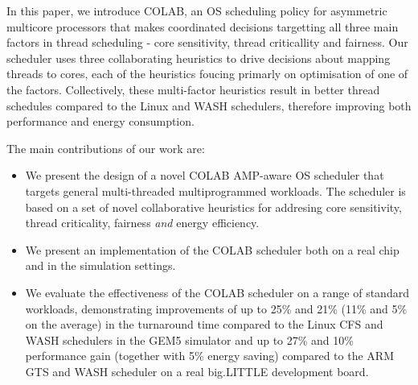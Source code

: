 In this paper, we introduce COLAB, an OS scheduling policy for asymmetric multicore processors that makes coordinated decisions targetting all three main factors in thread scheduling - core sensitivity, thread criticallity and fairness. Our scheduler uses three collaborating heuristics to drive decisions about mapping threads to cores, each of the heuristics foucing primarly on optimisation of one of the factors. Collectively, these multi-factor heuristics result in better thread schedules compared to the Linux and WASH schedulers, therefore improving both performance and energy consumption. %

The main contributions of our work are:
\begin{itemize}
\item  We present the design of a novel COLAB AMP-aware OS scheduler that targets general multi-threaded multiprogrammed workloads. The scheduler is based on a set of novel collaborative heuristics for addresing core sensitivity, thread criticality, fairness \emph{and} energy efficiency.
\item We present an implementation of the COLAB scheduler both on a real chip and in the simulation settings.
\item We evaluate the effectiveness of the COLAB scheduler on a range of standard workloads, demonstrating improvements of up to 25\% and 21\% (11\% and 5\% on the average) in the turnaround time compared to the Linux CFS and WASH schedulers in the GEM5 simulator and up to 27\% and 10\% performance gain (together with 5\% energy saving) compared to the ARM GTS and WASH scheduler on a real big.LITTLE development board.
\end{itemize}

